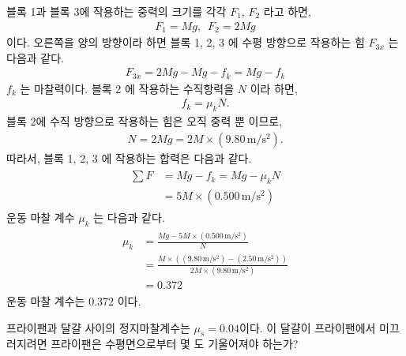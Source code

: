 \documentclass[floatfix,nofootinbib,superscriptaddress,fleqn,preprint]{revtex4}
\begin{document}
블록 1과 블록 3에 작용하는 중력의 크기를 각각 $F_1$, $F_2$ 라고 하면,
\begin{align}
  F_1 = Mg,\,\,\, F_2 = 2Mg
\end{align}
이다. 오른쪽을 양의 방향이라 하면 블록 1, 2, 3 에 수평 방향으로 작용하는 힘 $F_{3x}$ 는 
다음과 같다.
\begin{align}
  F_{3x} = 2Mg - Mg - f_k = Mg - f_k
\end{align}
$f_k$ 는 마찰력이다. 블록 2 에 작용하는 수직항력을 $N$ 이라 하면,
\begin{align}
  f_k = \mu_kN.
\end{align}
블록 2에 수직 방향으로 작용하는 힘은 오직 중력 뿐 이므로, 
\begin{align}
  N = 2Mg = 2M\times(9.80\,\mathrm{m/s^2}).
\end{align}
따라서, 블록 1, 2, 3 에 작용하는 합력은 다음과 같다.
\begin{align}
  \begin{split}
    \sum F &= Mg - f_k = Mg - \mu_kN \\
    &= 5M \times (0.500\,\mathrm{m/s^2})
  \end{split}
\end{align}
운동 마찰 계수 $\mu_k$ 는 다음과 같다.
\begin{align}
  \begin{split}
    \mu_k &= \frac{Mg - 5M \times (0.500\,\mathrm{m/s^2})}{N} \\
    &= \frac{M\times((9.80\,\mathrm{m/s^2})-(2.50\,\mathrm{m/s^2}))}
    {2M\times(9.80\,\mathrm{m/s^2})}  \\
    &= 0.372
  \end{split}
\end{align}
운동 마찰 계수는 0.372 이다.
\vspace{2cm}

 프라이팬과 달걀 사이의 정지마찰계수는
$\mu_s=0.04$이다. 이 달걀이 프라이팬에서 미끄러지려면 프라이팬은
수평면으로부터 몇 도 기울어져야 하는가?  \\
\end{document}
